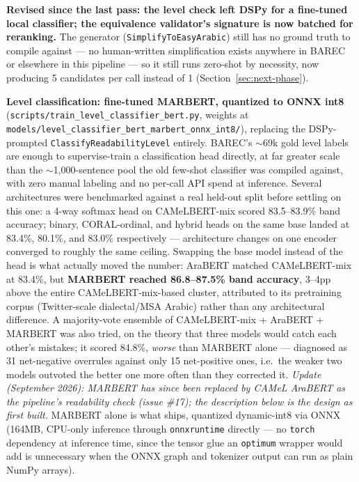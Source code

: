 \documentclass[11pt,a4paper]{article}
\begin{document}
\begin{noteb}
\textbf{Revised since the last pass: the level check left DSPy for a
fine-tuned local classifier; the equivalence validator's signature is now
batched for reranking.} The generator (\texttt{SimplifyToEasyArabic}) still
has no ground truth to compile against --- no human-written simplification
exists anywhere in BAREC or elsewhere in this pipeline --- so it still runs
zero-shot by necessity, now producing 5 candidates per call instead of 1
(Section~\ref{sec:next-phase}).

\textbf{Level classification: fine-tuned MARBERT, quantized to ONNX
int8} (\texttt{scripts/train\_level\_classifier\_bert.py}, weights at
\texttt{models/level\_classifier\_bert\_marbert\_onnx\_int8/}), replacing
the DSPy-prompted \texttt{ClassifyReadabilityLevel} entirely. BAREC's
$\sim$69k gold level labels are enough to supervise-train a classification
head directly, at far greater scale than the $\sim$1,000-sentence pool the
old few-shot classifier was compiled against, with zero manual labeling and
no per-call API spend at inference. Several architectures were benchmarked
against a real held-out split before settling on this one: a 4-way softmax
head on CAMeLBERT-mix scored 83.5--83.9\% band accuracy; binary,
CORAL-ordinal, and hybrid heads on the same base landed at 83.4\%, 80.1\%,
and 83.0\% respectively --- architecture changes on one encoder converged
to roughly the same ceiling. Swapping the base model instead of the head
is what actually moved the number: AraBERT matched CAMeLBERT-mix at
83.4\%, but \textbf{MARBERT reached 86.8--87.5\% band accuracy}, 3--4pp
above the entire CAMeLBERT-mix-based cluster, attributed to its
pretraining corpus (Twitter-scale dialectal/MSA Arabic) rather than any
architectural difference. A majority-vote ensemble of CAMeLBERT-mix +
AraBERT + MARBERT was also tried, on the theory that three models would
catch each other's mistakes; it scored 84.8\%, \emph{worse} than MARBERT
alone --- diagnosed as 31 net-negative overrules against only 15
net-positive ones, i.e.\ the weaker two models outvoted the better one more
often than they corrected it. \emph{Update (September 2026): MARBERT has since been replaced by CAMeL
AraBERT as the pipeline's readability check (issue \#17); the description below is
the design as first built.} MARBERT alone is what ships, quantized
dynamic-int8 via ONNX (164MB, CPU-only inference through
\texttt{onnxruntime} directly --- no \texttt{torch} dependency at inference
time, since the tensor glue an \texttt{optimum} wrapper would add is
unnecessary when the ONNX graph and tokenizer output can run as plain
NumPy arrays).


\end{noteb}
\end{document}
